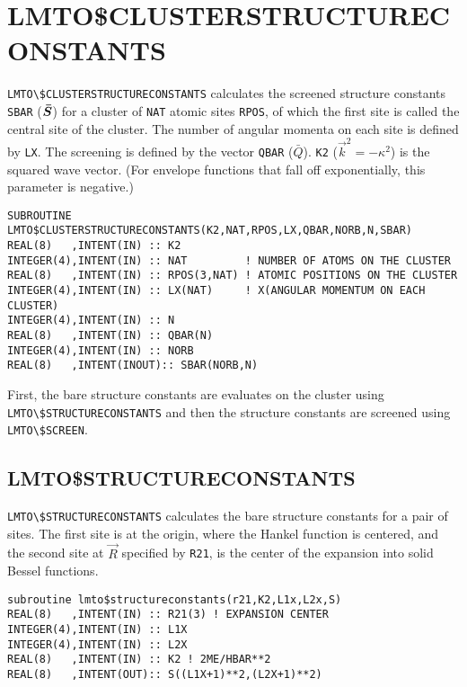 \documentclass[11pt,a4paper]{report}
\begin{document}
\section{LMTO\$CLUSTERSTRUCTURECONSTANTS}
\verb|LMTO\$CLUSTERSTRUCTURECONSTANTS| calculates the screened
structure constants \verb|SBAR| ($\bm{\bar{S}}$) for a cluster of
\verb|NAT| atomic sites \verb|RPOS|, of which the first site is called
the central site of the cluster. The number of angular momenta on each
site is defined by \verb|LX|. The screening is defined by the vector
\verb|QBAR| ($\bar{Q}$). \verb|K2| ($\vec{k}^2=-\kappa^2$) is the
squared wave vector. (For envelope functions that fall off
exponentially, this parameter is negative.)

\begin{verbatim}
SUBROUTINE LMTO$CLUSTERSTRUCTURECONSTANTS(K2,NAT,RPOS,LX,QBAR,NORB,N,SBAR)
REAL(8)   ,INTENT(IN) :: K2          
INTEGER(4),INTENT(IN) :: NAT         ! NUMBER OF ATOMS ON THE CLUSTER
REAL(8)   ,INTENT(IN) :: RPOS(3,NAT) ! ATOMIC POSITIONS ON THE CLUSTER
INTEGER(4),INTENT(IN) :: LX(NAT)     ! X(ANGULAR MOMENTUM ON EACH CLUSTER)
INTEGER(4),INTENT(IN) :: N
REAL(8)   ,INTENT(IN) :: QBAR(N)
INTEGER(4),INTENT(IN) :: NORB
REAL(8)   ,INTENT(INOUT):: SBAR(NORB,N)
\end{verbatim}




First, the bare structure constants are evaluates on the cluster using
\verb|LMTO\$STRUCTURECONSTANTS| and then the structure constants are
screened using \verb|LMTO\$SCREEN|.

\subsection{LMTO\$STRUCTURECONSTANTS}
\verb|LMTO\$STRUCTURECONSTANTS| calculates the bare structure
constants for a pair of sites. The first site is at the origin, where
the Hankel function is centered, and the second site at $\vec{R}$
specified by \verb|R21|, is the center of the expansion into solid
Bessel functions.

\begin{verbatim}
subroutine lmto$structureconstants(r21,K2,L1x,L2x,S)
REAL(8)   ,INTENT(IN) :: R21(3) ! EXPANSION CENTER
INTEGER(4),INTENT(IN) :: L1X
INTEGER(4),INTENT(IN) :: L2X
REAL(8)   ,INTENT(IN) :: K2 ! 2ME/HBAR**2
REAL(8)   ,INTENT(OUT):: S((L1X+1)**2,(L2X+1)**2)
\end{verbatim}
\end{document}
